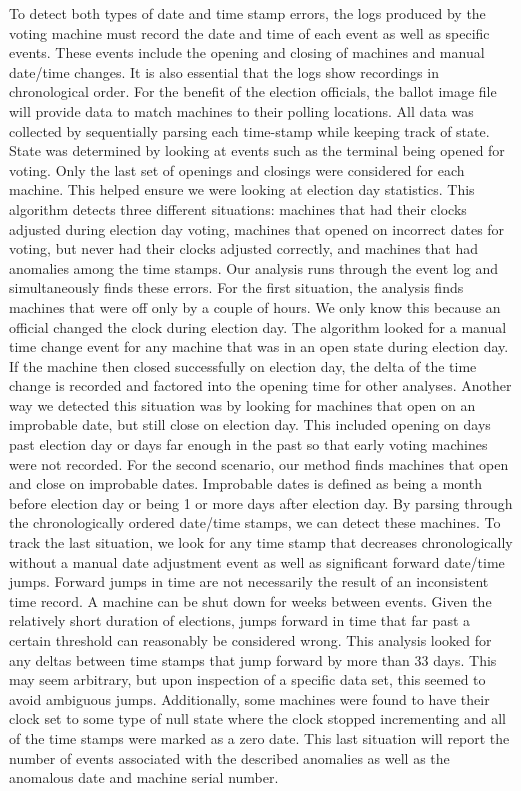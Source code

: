 To detect both types of date and time stamp errors, the logs produced by the voting machine must record the date and time of each event as well as specific events.  These events include the opening and closing of machines and manual date/time changes.  It is also essential that the logs show recordings in chronological order.  For the benefit of the election officials, the ballot image file will provide data to match machines to their polling locations.  All data was collected by sequentially parsing each time-stamp while keeping track of state. State was determined by looking at events such as the terminal being opened for voting. Only the last set of openings and closings were considered for each machine. This helped ensure we were looking at election day statistics.  This algorithm detects three different situations: machines that had their clocks adjusted during election day voting, machines that opened on incorrect dates for voting, but never had their clocks adjusted correctly, and machines that had anomalies among the time stamps.  Our analysis runs through the event log and simultaneously finds these errors.  For the first situation, the analysis finds machines that were off only by a couple of hours.  We only know this because an official changed the clock during election day.  The algorithm looked for a manual time change event for any machine that was in an open state during election day.  If the machine then closed successfully on election day, the delta of the time change is recorded and factored into the opening time for other analyses.  Another way we detected this situation was by looking for machines that open on an improbable date, but still close on election day.  This included opening on days past election day or days far enough in the past so that early voting machines were not recorded.  For the second scenario, our method finds machines that open and close on improbable dates.  Improbable dates is defined as being a month before election day or being 1 or more days after election day.  By parsing through the chronologically ordered date/time stamps, we can detect these machines.  To track the last situation, we look for any time stamp that decreases chronologically without a manual date adjustment event as well as significant forward date/time jumps.  Forward jumps in time are not necessarily the result of an inconsistent time record.  A machine can be shut down for weeks between events.  Given the relatively short duration of elections, jumps forward in time that far past a certain threshold can reasonably be considered wrong.  This analysis looked for any deltas between time stamps that jump forward by more than 33 days.  This may seem arbitrary, but upon inspection of a specific data set, this seemed to avoid ambiguous jumps.  Additionally, some machines were found to have their clock set to some type of null state where the clock stopped incrementing and all of the time stamps were marked as a zero date.  This last situation will report the number of events associated with the described anomalies as well as the anomalous date and machine serial number.      
